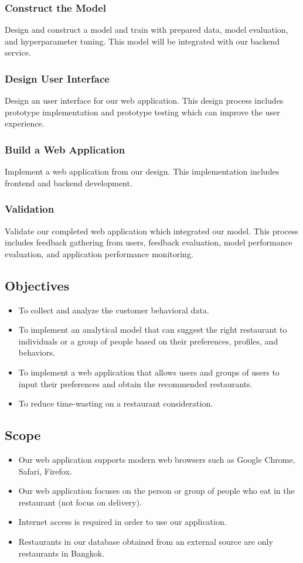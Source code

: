 \documentclass[12pt,oneside,openright,a4paper]{cpe-english-project}
\begin{document}
\subsubsection{Construct the Model} 
Design and construct a model and train with prepared data, model evaluation, and hyperparameter tuning. This model will be integrated with our backend service.

\subsubsection{Design User Interface} 
Design an user interface for our web application. This design process includes prototype implementation and prototype testing which can improve the user experience.

\subsubsection{Build a Web Application} 
Implement a web application from our design. This implementation includes frontend and backend development.

\subsubsection{Validation} 
Validate our completed web application which integrated our model. This process includes feedback gathering from users, feedback evaluation, model performance evaluation, and application performance monitoring.


\subsection{Objectives} 
\begin{itemize}
\item  To collect and analyze the customer behavioral data.
\item  To implement an analytical model that can suggest the right restaurant to individuals or a group of people based on their preferences, profiles, and behaviors.
\item  To implement a web application that allows users and groups of users to input their preferences and obtain the recommended restaurants.
\item To reduce time-wasting on a restaurant consideration. 
\end{itemize}

\subsection{Scope} 
\begin{itemize}
\item Our web application supports modern web browsers such as Google Chrome, Safari, Firefox.
\item Our web application focuses on the person or group of people who eat in the restaurant (not focus on delivery).
\item Internet access is required in order to use our application.
\item Restaurants in our database obtained from an external source are only restaurants in Bangkok.
\end{itemize}
\end{document}
